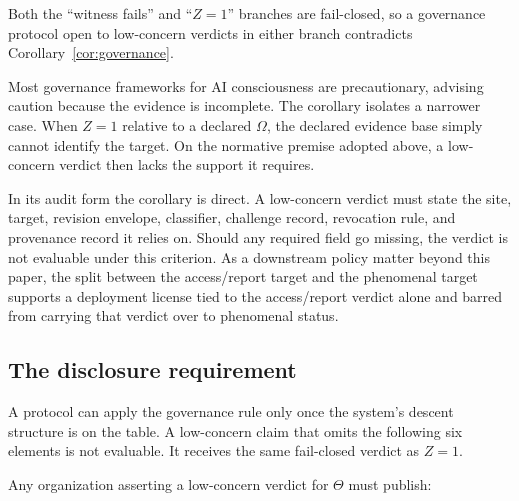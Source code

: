 \documentclass[11pt]{article}
\begin{document}
Both the ``witness fails'' and ``$Z = 1$'' branches are fail-closed, so a
governance protocol open to low-concern verdicts in either branch contradicts
Corollary~\ref{cor:governance}.

Most governance frameworks for AI consciousness are precautionary, advising
caution because the evidence is incomplete. The corollary isolates a narrower
case. When $Z = 1$ relative to a declared $\Omega$, the declared evidence base
simply cannot identify the target. On the normative premise adopted above, a
low-concern verdict then lacks the support it requires.

In its audit form the corollary is direct. A low-concern verdict must state the
site, target, revision envelope, classifier, challenge record, revocation rule,
and provenance record it relies on. Should any required field go missing,
the verdict is not evaluable under this criterion.
As a downstream policy matter beyond this paper, the split between the
access/report target and the phenomenal target supports a deployment license
tied to the access/report verdict alone and barred from carrying that verdict
over to phenomenal status.

\subsection{The disclosure requirement}
\label{sec:disclosure}

A protocol can apply the governance rule only once the system's descent
structure is on the table. A low-concern claim that omits the following six
elements is not evaluable. It receives the same fail-closed verdict as
$Z = 1$.

Any organization asserting a low-concern verdict for $\Theta$ must publish:
\end{document}
